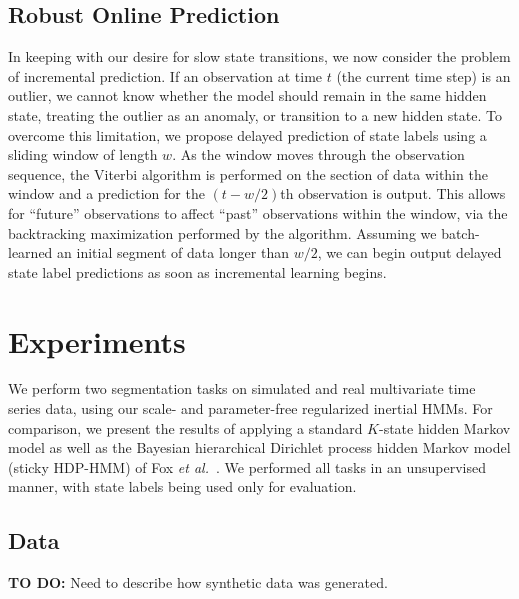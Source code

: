 \documentclass[12pt]{article}
\begin{document}
\subsection{Robust Online Prediction}

In keeping with our desire for slow state transitions, we now consider the problem of incremental prediction. If an observation at time $t$ (the current time step) is an outlier, we cannot know whether the model should remain in the same hidden state, treating the outlier as an anomaly, or transition to a new hidden state. To overcome this limitation, we propose delayed prediction of state labels using a sliding window of length $w$. As the window moves through the observation sequence, the Viterbi algorithm is performed on the section of data within the window and a prediction for the $(t - w/2)$th observation is output. This allows for ``future'' observations to affect ``past'' observations within the window, via the backtracking maximization performed by the algorithm. Assuming we batch-learned an initial segment of data longer than $w/2$, we can begin output delayed state label predictions as soon as incremental learning begins.

\section{Experiments}\label{sec:Experiments}

We perform two segmentation tasks on simulated and real multivariate time series data, using our scale- and parameter-free regularized inertial HMMs. For comparison, we present the results of applying a standard $K$-state hidden Markov model as well as the Bayesian hierarchical Dirichlet process hidden Markov model (sticky HDP-HMM) of Fox \emph{et al.}~\cite{fox2011sticky}. We performed all tasks in an unsupervised manner, with state labels being used only for evaluation.

\subsection{Data}\label{sec:datasets}
\textbf{TO DO:} Need to describe how synthetic data was generated.

%
\end{document}
